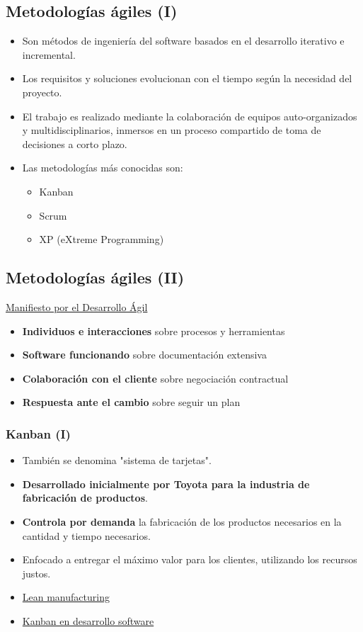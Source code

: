 \documentclass[a4paper]{article}
\begin{document}
\subsection{Metodologías ágiles (I)}
\label{metodologías-ágiles-i}
\begin{itemize}
\item Son métodos de ingeniería del software basados en el desarrollo
iterativo e incremental.
\item Los requisitos y soluciones evolucionan con el tiempo según la
necesidad del proyecto.
\item El trabajo es realizado mediante la colaboración de equipos
auto-organizados y multidisciplinarios, inmersos en un proceso
compartido de toma de decisiones a corto plazo.
\item Las metodologías más conocidas son:
\begin{itemize}
\item Kanban
\item Scrum
\item XP (eXtreme Programming)
\end{itemize}
\end{itemize}
\subsection{Metodologías ágiles (II)}
\label{metodologías-ágiles-ii}
\href{https://es.wikipedia.org/wiki/Manifiesto\_\%C3\%A1gil}{Manifiesto por el
Desarrollo Ágil}

\begin{itemize}
\item \textbf{Individuos e interacciones} sobre procesos y herramientas
\item \textbf{Software funcionando} sobre documentación extensiva
\item \textbf{Colaboración con el cliente} sobre negociación contractual
\item \textbf{Respuesta ante el cambio} sobre seguir un plan
\end{itemize}
\subsubsection{\textbf{Kanban (I)}}
\label{kanban-i}
\begin{itemize}
\item También se denomina "sistema de tarjetas".
\item \textbf{Desarrollado inicialmente por Toyota para la industria de fabricación
de productos}.
\item \textbf{Controla por demanda} la fabricación de los productos necesarios en
la cantidad y tiempo necesarios.
\item Enfocado a entregar el máximo valor para los clientes, utilizando los
recursos justos.
\item \href{https://es.wikipedia.org/wiki/Lean\_manufacturing}{Lean
manufacturing}
\item \href{https://dosideas.com/noticias/metodologias/184-como-usar-kanban-en-el-desarrollo-de-software}{Kanban
en desarrollo software}
\end{itemize}
\end{document}
